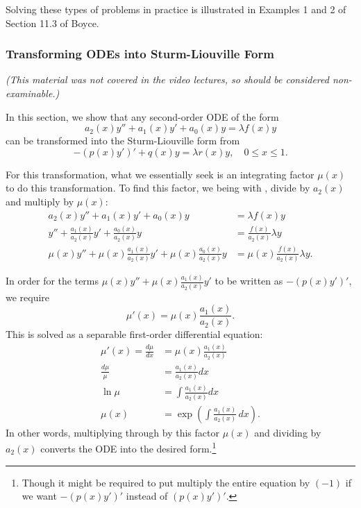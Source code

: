 Solving these types of problems in practice is illustrated in Examples 1 and 2 of Section 11.3 of Boyce.

\subsubsection{Transforming ODEs into Sturm-Liouville Form}

\emph{(This material was not covered in the video lectures, so should be considered non-examinable.)}

In this section, we show that any second-order ODE of the form
\begin{equation}\label{eq:sltransform}
	a_2(x)y'' + a_1(x)y' + a_0(x)y = \lambda f(x)y
\end{equation}
can be transformed into the Sturm-Liouville form from 
\begin{equation}\label{eq:sltransform2}
	-\left(p(x)y'\right)' + q(x)y = \lambda r(x)y, \quad 0 \leq x \leq 1.
\end{equation}

For this transformation, what we essentially seek is an integrating factor $\mu(x)$ to do this transformation. To find this factor, we being with , divide by $a_2(x)$ and multiply by $\mu(x)$:
\begin{align*}
	a_2(x)y'' + a_1(x)y' + a_0(x)y &= \lambda f(x)y \\
	y'' + \frac{a_1(x)}{a_2(x)}y' + \frac{a_0(x)}{a_2(x)}y &= \frac{f(x)}{a_2(x)}\lambda y \\
	\mu(x)y'' + \mu(x)\frac{a_1(x)}{a_2(x)}y' + \mu(x)\frac{a_0(x)}{a_2(x)}y &= \mu(x)\frac{f(x)}{a_2(x)}\lambda y.
\end{align*}

In order for the terms $\mu(x)y'' + \mu(x)\frac{a_1(x)}{a_2(x)}y'$ to be written as $-(p(x)y')'$, we require
\[
\mu'(x) = \mu(x)\frac{a_1(x)}{a_2(x)}.
\]
This is solved as a separable first-order differential equation:
\begin{align*}
	\mu'(x) = \frac{d\mu}{dx} &= \mu(x)\frac{a_1(x)}{a_2(x)} \\
	\frac{d\mu}{\mu} &= \frac{a_1(x)}{a_2(x)} dx \\ \ln\mu &= \int \frac{a_1(x)}{a_2(x)} dx \\
	\mu(x) &= \exp\left(\int \frac{a_1(x)}{a_2(x)} \,dx\right).
\end{align*}
In other words, multiplying through by this factor $\mu(x)$ and dividing by $a_2(x)$ converts the ODE into the desired form.\footnote{Though it might be required to put multiply the entire equation by $(-1)$ if we want $-(p(x)y')'$ instead of $(p(x)y')'$.}

